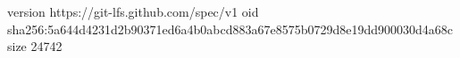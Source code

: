 version https://git-lfs.github.com/spec/v1
oid sha256:5a644d4231d2b90371ed6a4b0abcd883a67e8575b0729d8e19dd900030d4a68c
size 24742
